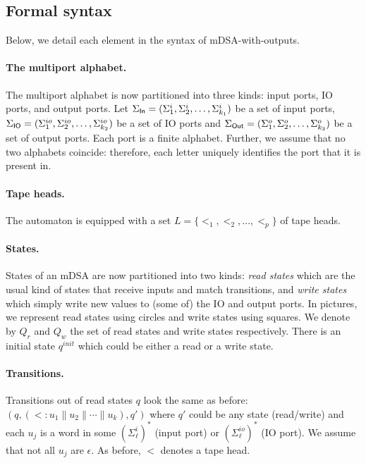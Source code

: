 \subsection{Formal syntax} 

Below, we detail each element in the syntax of mDSA-with-outputs.

\paragraph*{The multiport alphabet.} The multiport alphabet is now partitioned into three kinds: input ports, IO ports, and output ports. Let $\Sigma_{\mathsf{In}} = (\Sigma_1^{i}, \Sigma_2^{i}, \dots, \Sigma_{k_1}^{i})$ be a set of input ports, $\Sigma_{\mathsf{IO}} =(\Sigma_1^{io}, \Sigma_2^{io}, \dots, \Sigma_{k_2}^{io})$ be a set of IO ports and $\Sigma_{\mathsf{Out}} = (\Sigma_1^{o}, \Sigma_2^{o}, \dots, \Sigma_{k_3}^{o})$ be a set of output ports. Each port is a finite alphabet. Further, we assume that no two alphabets coincide: therefore, each letter uniquely identifies the port that it is present in. 

\paragraph*{Tape heads.} The automaton is equipped with a set $L = \{ \lt_1, \lt_2, \dots, \lt_p\}$ of tape heads. 

\paragraph*{States.} States of an mDSA are now partitioned into two kinds: \emph{read states} which are the usual kind of states that receive inputs and match transitions, and \emph{write states} which simply write new values to (some of) the IO and output ports. In pictures, we represent read states using circles and write states using squares. We denote by $Q_r$ and $Q_w$ the set of read states and write states respectively. There is an initial state $q^{init}$ which could be either a read or a write state. 

\paragraph*{Transitions.} Transitions out of read states $q$ look the same as before: $(q, (\lt: u_1 \parallel u_2 \parallel \cdots \parallel u_k), q')$ where $q'$ could be any state (read/write) and each $u_j$ is a word in some $(\Sigma^i_\ell)^*$ (input port) or $(\Sigma^{io}_\ell)^*$ (IO port).  We assume that not all $u_j$ are $\epsilon$. As before, $\lt$ denotes a tape head. 

